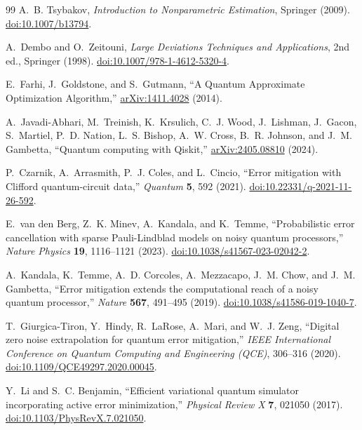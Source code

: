 \documentclass[a4paper,onecolumn,unpublished,nopdfoutputerror]{quantumarticle}
\theoremstyle{plain}
\theoremstyle{definition}
\newcommand{\1}{\mathbf{1}}
\begin{document}
\begin{thebibliography}{99}
A.~B. Tsybakov,
\emph{Introduction to Nonparametric Estimation},
Springer (2009). \href{https://doi.org/10.1007/b13794}{doi:10.1007/b13794}.

A.~Dembo and O.~Zeitouni,
\emph{Large Deviations Techniques and Applications},
2nd ed., Springer (1998). \href{https://doi.org/10.1007/978-1-4612-5320-4}{doi:10.1007/978-1-4612-5320-4}.

E.~Farhi, J.~Goldstone, and S.~Gutmann,
``A Quantum Approximate Optimization Algorithm,''
\href{https://arxiv.org/abs/1411.4028}{arXiv:1411.4028} (2014).

A.~Javadi-Abhari, M.~Treinish, K.~Krsulich, C.~J. Wood, J.~Lishman, J.~Gacon, S.~Martiel, P.~D. Nation, L.~S. Bishop, A.~W. Cross, B.~R. Johnson, and J.~M. Gambetta,
``Quantum computing with Qiskit,''
\href{https://arxiv.org/abs/2405.08810}{arXiv:2405.08810} (2024).

P.~Czarnik, A.~Arrasmith, P.~J. Coles, and L.~Cincio,
``Error mitigation with Clifford quantum-circuit data,''
\emph{Quantum} \textbf{5}, 592 (2021). \href{https://doi.org/10.22331/q-2021-11-26-592}{doi:10.22331/q-2021-11-26-592}.

E.~van den Berg, Z.~K. Minev, A.~Kandala, and K.~Temme,
``Probabilistic error cancellation with sparse Pauli-Lindblad models on noisy quantum processors,''
\emph{Nature Physics} \textbf{19}, 1116--1121 (2023). \href{https://doi.org/10.1038/s41567-023-02042-2}{doi:10.1038/s41567-023-02042-2}.

A.~Kandala, K.~Temme, A.~D. Corcoles, A.~Mezzacapo, J.~M. Chow, and J.~M. Gambetta,
``Error mitigation extends the computational reach of a noisy quantum processor,''
\emph{Nature} \textbf{567}, 491--495 (2019). \href{https://doi.org/10.1038/s41586-019-1040-7}{doi:10.1038/s41586-019-1040-7}.

T.~Giurgica-Tiron, Y.~Hindy, R.~LaRose, A.~Mari, and W.~J. Zeng,
``Digital zero noise extrapolation for quantum error mitigation,''
\emph{IEEE International Conference on Quantum Computing and Engineering (QCE)}, 306--316 (2020). \href{https://doi.org/10.1109/QCE49297.2020.00045}{doi:10.1109/QCE49297.2020.00045}.

Y.~Li and S.~C. Benjamin,
``Efficient variational quantum simulator incorporating active error minimization,''
\emph{Physical Review X} \textbf{7}, 021050 (2017). \href{https://doi.org/10.1103/PhysRevX.7.021050}{doi:10.1103/PhysRevX.7.021050}.


\end{thebibliography}
\end{document}
